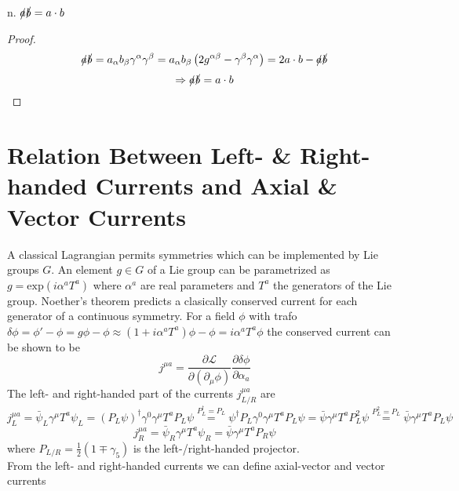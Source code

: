 n. $\slashed{a}\slashed{b} = a \cdot b$
\begin{proof}
\begin{equation*}
\slashed{a} \slashed{b} = a_{\alpha} b_{\beta} \gamma^{\alpha}\gamma^{\beta} = a_{\alpha} b_{\beta} \left( 2 g^{\alpha\beta} - \gamma^{\beta}\gamma^{\alpha} \right) = 2 a \cdot b - \slashed{a}\slashed{b}
\end{equation*}
\begin{equation*}
\Rightarrow \slashed{a}\slashed{b} = a \cdot b
\end{equation*}
\end{proof}


\section{Relation Between Left- \& Right-handed Currents and Axial \& Vector Currents}
\label{app:Currents}
A classical Lagrangian permits symmetries which can be implemented by Lie groups $G$. An element $g \in G$ of a Lie group can be parametrized as $g = \mathrm{exp} \left(i \alpha^a T^a \right)$ where $\alpha^a$ are real parameters and $T^a$ the generators of the Lie group. Noether's theorem predicts a clasically conserved current for each generator of a continuous symmetry. For a field $\phi$ with trafo $\delta\phi = \phi' - \phi = g \phi - \phi \approx \left( 1 + i \alpha^a T^a \right) \phi - \phi = i \alpha^a T^a \phi$ the conserved current can be shown to be
\begin{equation*}
j^{\mu a} = \frac{\partial \mathcal{L}}{\partial \left( \partial_{\mu} \phi \right)} \frac{\partial \delta\phi}{\partial \alpha_a}
\end{equation*} 
The left- and right-handed part of the currents $j^{\mu a}_{L/R}$ are
\begin{equation*}
j^{\mu a}_L = \bar{\psi}_L \gamma^{\mu} T^a \psi_L = \left( P_L \psi \right)^{\dagger} \gamma^0 \gamma^{\mu} T^a P_L \psi \overset{P_L^{\dagger}=P_L}{=} \psi^{\dagger} P_L \gamma^0 \gamma^{\mu} T^a P_L \psi = \bar{\psi} \gamma^{\mu} T^a P_L^2 \psi \overset{P_L^2 = P_L}{=} \bar{\psi} \gamma^{\mu} T^a P_L \psi
\end{equation*}
\begin{equation*}
j^{\mu a}_R = \bar{\psi}_R \gamma^{\mu} T^a \psi_R = \bar{\psi} \gamma^{\mu} T^a P_R \psi
\end{equation*}
where $P_{L/R} = \frac{1}{2} \left( 1 \mp \gamma_5 \right)$ is the left-/right-handed projector. \\
From the left- and right-handed currents we can define axial-vector and vector currents
